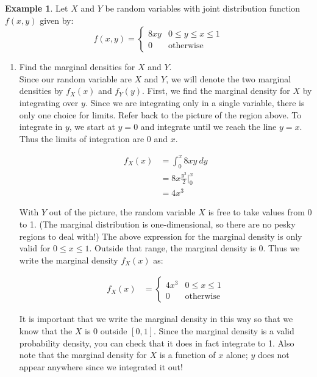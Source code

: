\documentclass[12pt]{article}
\theoremstyle{definition}
\newtheorem*{example}{Example}
\theoremstyle{remark}
\begin{document}
\begin{example}
Let $X$ and $Y$ be random variables with joint distribution function $f(x, y)$ given by:
\[
f(x, y) = \begin{cases} 
      8 x y  & 0 \leq y \leq x \leq 1 \\
      0 & \textrm{otherwise}
   \end{cases}
\]
\begin{enumerate}
\item Find the marginal densities for $X$ and $Y$.\\

Since our random variable are $X$ and $Y$, we will denote the two marginal densities by $f_X(x)$ and $f_Y(y)$. First, we find the marginal density for $X$ by integrating over $y$. Since we are integrating only in a single variable, there is only one choice for limits. Refer back to the picture of the region above. To integrate in $y$, we start at $y = 0$ and integrate until we reach the line $y = x$. Thus the limits of integration are 0 and $x$.

\begin{align*}
f_X(x) &= \int_0^x 8 x y \: dy \\
&= 8x \frac{y^2}{2} \Bigr|_0^x \\
&= 4 x^3
\end{align*}

With $Y$ out of the picture, the random variable $X$ is free to take values from 0 to 1. (The marginal distribution is one-dimensional, so there are no pesky regions to deal with!) The above expression for the marginal density is only valid for $0 \leq x \leq 1$. Outside that range, the marginal density is 0. Thus we write the marginal density $f_X(x)$ as:

\begin{align*}
f_X(x) &= \begin{cases}
  4 x^3 & 0 \leq x \leq 1 \\
  0 & \textrm{otherwise}
   \end{cases}
\end{align*}

It is important that we write the marginal density in this way so that we know that the $X$ is 0 outside $[0, 1]$. Since the marginal density is a valid probability density, you can check that it does in fact integrate to 1. Also note that the marginal density for $X$ is a function of $x$ alone; $y$ does not appear anywhere since we integrated it out!\\


\end{enumerate}
\end{example}
\end{document}

